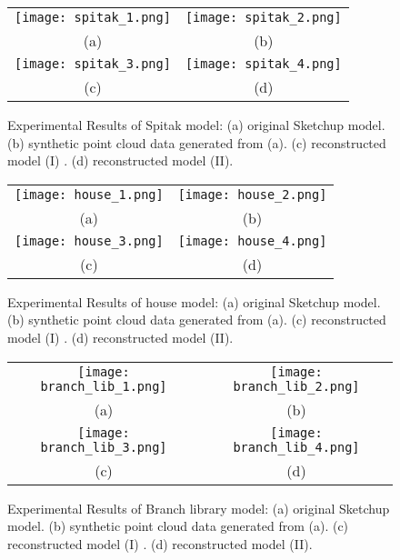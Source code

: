 \begin{figure} [htbp]
\begin{center}
\begin{tabular}{cc}
\texttt{[image: spitak\_1.png]} &
\texttt{[image: spitak\_2.png]} \\
(a) & (b) \\
\texttt{[image: spitak\_3.png]} &
\texttt{[image: spitak\_4.png]} \\
(c) & (d)
\end{tabular}
\end{center}
\caption{Experimental Results of Spitak model:
      (a) original Sketchup model.
      (b) synthetic point cloud data generated from (a).
      (c) reconstructed model (I) .
      (d) reconstructed model (II).}
\label{fig:ER_Fig2}
\end{figure}

\begin{figure} [htbp]
\begin{center}
\begin{tabular}{cc}
\texttt{[image: house\_1.png]} &
\texttt{[image: house\_2.png]} \\
(a) & (b) \\
\texttt{[image: house\_3.png]} &
\texttt{[image: house\_4.png]} \\
(c) & (d)
\end{tabular}
\end{center}
\caption{Experimental Results of house model:
      (a) original Sketchup model.
      (b) synthetic point cloud data generated from (a).
      (c) reconstructed model (I) .
      (d) reconstructed model (II).}
\label{fig:ER_Fig3}
\end{figure}

\begin{figure} [htbp]
\begin{center}
\begin{tabular}{cc}
\texttt{[image: branch\_lib\_1.png]} &
\texttt{[image: branch\_lib\_2.png]} \\
(a) & (b) \\
\texttt{[image: branch\_lib\_3.png]} &
\texttt{[image: branch\_lib\_4.png]} \\
(c) & (d)
\end{tabular}
\end{center}
\caption{Experimental Results of Branch library model:
      (a) original Sketchup model.
      (b) synthetic point cloud data generated from (a).
      (c) reconstructed model (I) .
      (d) reconstructed model (II).}
\label{fig:ER_Fig4}
\end{figure}

